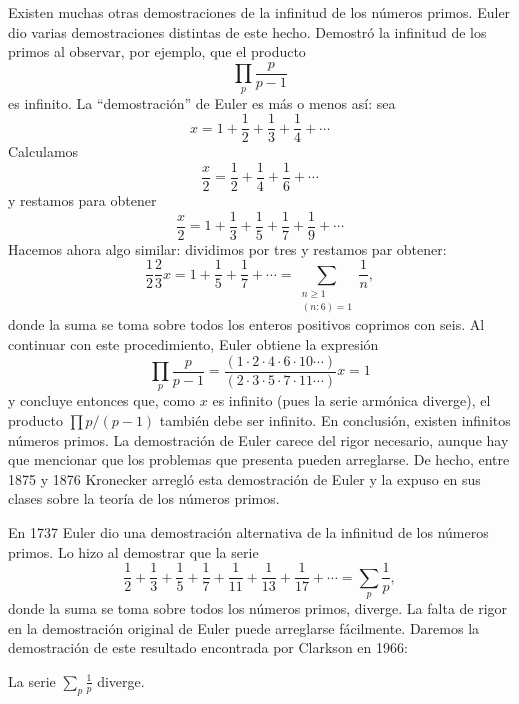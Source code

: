 
Existen muchas otras demostraciones de la infinitud de los números primos. 
Euler dio varias demostraciones distintas de este hecho. Demostró la infinitud
de los primos al observar, por ejemplo, que el producto
\[
	\prod_{p}\frac{p}{p-1}
\]
es infinito. La ``demostración'' de Euler es más o menos así: sea
\[
	x=1+\frac12+\frac13+\frac14+\cdots
\]
Calculamos 
\[
	\frac{x}{2}=\frac12+\frac14+\frac16+\cdots
\]
y restamos para obtener
\[
	\frac{x}{2}=1+\frac13+\frac15+\frac17+\frac19+\cdots
\]
Hacemos ahora algo similar: dividimos por tres y restamos par obtener:
\[
	\frac12\frac23x=1+\frac15+\frac17+\cdots=\sum_{\substack{n\geq1\\(n:6)=1}}\frac1n,
\]
donde la suma se toma sobre todos los enteros positivos coprimos con seis. Al
continuar con este procedimiento, Euler obtiene la expresión
\[
	\prod_p\frac{p}{p-1}
	=\frac{(1\cdot 2\cdot 4\cdot 6\cdot 10\cdots)}{(2\cdot 3\cdot 5\cdot 7\cdot 11\cdots)}x=1
\]
y concluye entonces que, como $x$ es infinito (pues la serie armónica diverge),
el producto $\prod p/(p-1)$ también debe ser infinito. En conclusión, existen
infinitos números primos. La demostración de Euler carece del rigor necesario,
aunque hay que mencionar que los problemas que presenta pueden arreglarse. De
hecho, entre 1875 y 1876 Kronecker arregló esta demostración de Euler y la
expuso en sus clases sobre la teoría de los números primos.

En 1737 Euler dio una demostración alternativa de la infinitud de los números
primos. Lo hizo al demostrar que la serie
\[
	\frac12+\frac13+\frac15+\frac17+\frac{1}{11}+\frac{1}{13}+\frac{1}{17}+\cdots=\sum_{p}\frac{1}{p},
\]
donde la suma se toma sobre todos los números primos, diverge. La falta de
rigor en la demostración original de Euler puede arreglarse fácilmente. Daremos
la demostración de este resultado encontrada por Clarkson en 1966:

\begin{theorem}[Euler]
	La serie $\sum_{p}\frac{1}{p}$ diverge. 
\end{theorem}

